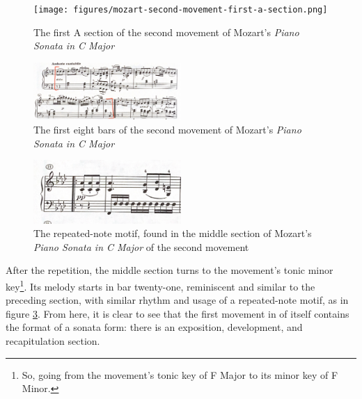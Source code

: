 \begin{figure}
    \centering
    \texttt{[image: figures/mozart-second-movement-first-a-section.png]}
    \caption{The first A section of the second movement of Mozart's \textit{Piano Sonata in C Major}}
    \label{fig:mozart-second-movement-first-a-section}
\end{figure}

\begin{figure}
    \centering
    \includegraphics[width=0.5\textwidth]{figures/mozart-second-movement-first-eight-bars.png}
    \caption{The first eight bars of the second movement of Mozart's \textit{Piano Sonata in C Major}}
    \label{fig:mozart-second-movement-first-eight-bars}
\end{figure}

\begin{figure}
    \centering
    \includegraphics[width=0.5\textwidth]{figures/mozart-second-movement-repeated-note-motif-middle-section.png}
    \caption{The repeated-note motif, found in the middle section of Mozart's \textit{Piano Sonata in C Major} of the second movement}
    \label{fig:mozart-second-movement-middle-section-motif}
\end{figure}

After the repetition, the middle section turns to the movement's tonic minor key\footnote{So, going from the movement's tonic key of F Major to its minor key of F Minor.}. Its melody starts in bar twenty-one, reminiscent and similar to the preceding section, with similar rhythm and usage of a repeated-note motif, as in figure \ref{fig:mozart-second-movement-middle-section-motif}\autocite{Henle_1977}. From here, it is clear to see that the first movement in of itself contains the format of a sonata form: there is an exposition, development, and recapitulation section.

